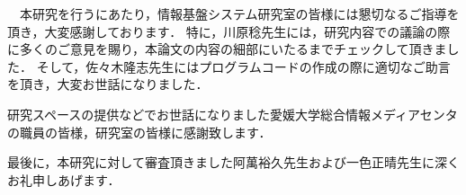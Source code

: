 \documentclass{thesis}
\begin{document}


\tableofcontents











\acknowledgement

　本研究を行うにあたり，情報基盤システム研究室の皆様には懇切なるご指導を頂き，大変感謝しております．
特に，川原稔先生には，研究内容での議論の際に多くのご意見を賜り，本論文の内容の細部にいたるまでチェックして頂きました．
そして，佐々木隆志先生にはプログラムコードの作成の際に適切なご助言を頂き，大変お世話になりました．

研究スペースの提供などでお世話になりました愛媛大学総合情報メディアセンタの職員の皆様，研究室の皆様に感謝致します．

最後に，本研究に対して審査頂きました阿萬裕久先生および一色正晴先生に深くお礼申しあげます．


\begin{comment}


\nocite{*}
\end{comment}
\end{document}
